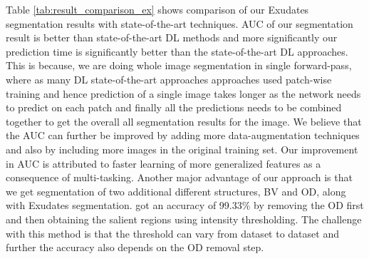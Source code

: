 \documentclass[utf8]{FrontiersinHarvard} %
\begin{document}
Table \ref{tab:result_comparison_ex} shows comparison of our Exudates segmentation results with state-of-the-art techniques. AUC of our segmentation result is better than state-of-the-art DL methods \cite{kou2020enhanced} and more significantly our prediction time is significantly better than the state-of-the-art DL approaches. This is because, we are doing whole image segmentation in single forward-pass, where as many DL state-of-the-art approaches approaches used patch-wise training and hence prediction of a single image takes longer as the network needs to predict on each patch and finally all the predictions needs to be combined together to get the overall all segmentation results for the image.  We believe that the AUC can further be improved by adding more data-augmentation techniques and also by including more images in the original training set. Our improvement in AUC is attributed to faster learning of more generalized features as a consequence of multi-tasking. Another major advantage of our approach is that we get segmentation of two additional different structures, BV and OD, along with Exudates segmentation. \cite{nur2018exudate} got an accuracy of 99.33\% by removing the OD first and then obtaining the salient regions using intensity thresholding. The challenge with this method is that the threshold can vary from dataset to dataset and further the accuracy also depends on the OD removal step.
\end{document}
